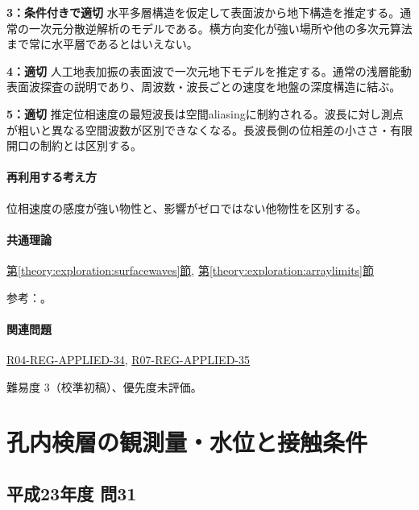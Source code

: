 \noindent\textbf{3：条件付きで適切} 水平多層構造を仮定して表面波から地下構造を推定する。通常の一次元分散逆解析のモデルである。横方向変化が強い場所や他の多次元算法まで常に水平層であるとはいえない。\par

\noindent\textbf{4：適切} 人工地表加振の表面波で一次元地下モデルを推定する。通常の浅層能動表面波探査の説明であり、周波数・波長ごとの速度を地盤の深度構造に結ぶ。\par

\noindent\textbf{5：適切} 推定位相速度の最短波長は空間aliasingに制約される。波長に対し測点が粗いと異なる空間波数が区別できなくなる。長波長側の位相差の小ささ・有限開口の制約とは区別する。\par

\paragraph{再利用する考え方} 位相速度の感度が強い物性と、影響がゼロではない他物性を区別する。

\paragraph{共通理論} \hyperref[theory:exploration:surfacewaves]{第\ref*{theory:exploration:surfacewaves}節}, \hyperref[theory:exploration:arraylimits]{第\ref*{theory:exploration:arraylimits}節}

\par 参考：\cite{epa_surfacewaves,xia_rayleigh1999,japansea_spac2017,array_limits2002}。

\paragraph{関連問題} \hyperref[q:r04-reg-applied-34]{R04-REG-APPLIED-34}, \hyperref[q:r07-reg-applied-35]{R07-REG-APPLIED-35}

\par 難易度 3（校準初稿）、優先度未評価。

\section{孔内検層の観測量・水位と接触条件}

\subsection{平成23年度 問31}
\label{q:h23-reg-applied-31}

